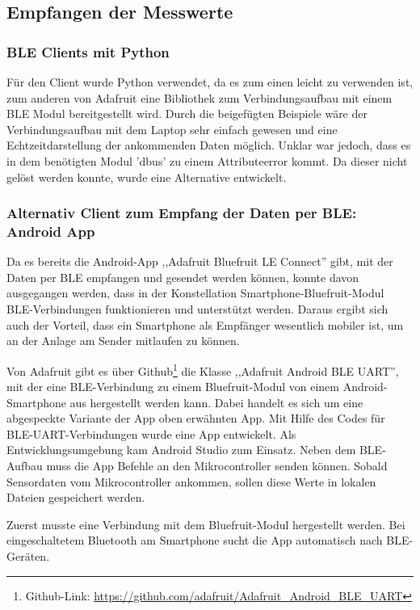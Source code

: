 \subsection{Empfangen der Messwerte}

\subsubsection{BLE Clients mit Python}
Für den Client wurde Python verwendet, da es zum einen leicht zu verwenden ist, zum anderen von Adafruit eine Bibliothek zum Verbindungsaufbau mit einem BLE Modul bereitgestellt wird. Durch die beigefügten Beispiele wäre der Verbindungsaufbau mit dem Laptop sehr einfach gewesen und eine Echtzeitdarstellung der ankommenden Daten möglich. Unklar war jedoch, dass es in dem benötigten Modul 'dbus' zu einem Attributeerror kommt. Da dieser nicht gelöst werden konnte, wurde eine Alternative entwickelt.

\subsubsection{Alternativ Client zum Empfang der Daten per BLE: Android App}
\label{AndroidAppFürDatenmessen}
Da es bereits die Android-App ,,Adafruit Bluefruit LE Connect'' gibt, mit der Daten per BLE empfangen und gesendet werden können, konnte davon ausgegangen werden, dass in der Konstellation Smartphone-Bluefruit-Modul BLE-Verbindungen funktionieren und unterstützt werden. Daraus ergibt sich auch der Vorteil, dass ein Smartphone als Empfänger wesentlich mobiler ist, um an der Anlage am Sender mitlaufen zu können. 

Von Adafruit gibt es über Github\footnote{Github-Link: \url{https://github.com/adafruit/Adafruit_Android_BLE_UART}} die Klasse ,,Adafruit Android BLE UART'', mit der eine BLE-Verbindung zu einem Bluefruit-Modul von einem Android-Smartphone aus hergestellt werden kann. Dabei handelt es sich um eine abgespeckte Variante der App oben erwähnten App. Mit Hilfe des Codes für BLE-UART-Verbindungen wurde eine App entwickelt. Als Entwicklungsumgebung kam Android Studio zum Einsatz. Neben dem BLE-Aufbau muss die App Befehle an den Mikrocontroller senden können. Sobald Sensordaten vom Mikrocontroller ankommen, sollen diese Werte in lokalen Dateien gespeichert werden.

Zuerst musste eine Verbindung mit dem Bluefruit-Modul hergestellt werden. Bei eingeschaltetem Bluetooth am Smartphone sucht die App automatisch nach BLE-Geräten. 

